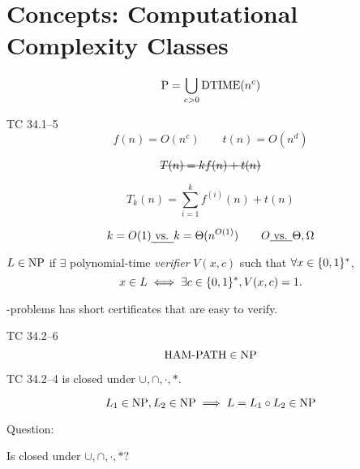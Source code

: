 \section{Concepts: Computational Complexity Classes}

\begin{frame}{\p}
  \[
	\text{P} = \bigcup_{c > 0} \text{DTIME}(n^c)
  \]

  \begin{exampleblock}{TC 34.1--5}
	\[ 
	  f(n) = O(n^c) \qquad t(n) = O(n^d)
	\]
  \end{exampleblock}

  \[
	\hbox{\sout{$T(n) = kf(n) + t(n)$}}
  \]

  \[
	T_{k}(n) = \sum_{i=1}^{k}f^{(i)}(n) + t(n) 
  \]

  \[
	k = O(1) \text{\emph{ vs. }} k = \Theta(n^{O(1)}) \qquad O \emph{\text{ vs. }} \Theta, \Omega
  \]
\end{frame}
\begin{frame}{\np}
  \begin{definition}[\np]
	$L \in \text{NP}$ if $\exists$ polynomial-time \emph{verifier} $V(x,c)$ such that $\forall x \in \{0,1\}^{\ast}$,
	\[
	  x \in L \iff \exists c \in \{0,1\}^{\ast}, V(x,c) = 1.
	\]
  \end{definition}

  \vspace{0.50cm}
  \centerline{\np-problems has short certificates that are easy to verify.}

  \vspace{0.60cm}
  \begin{exampleblock}{TC 34.2--6}
	\[
	  \text{HAM-PATH} \in \text{NP}
	\]
  \end{exampleblock}
\end{frame}
\begin{frame}{\np}
  \begin{exampleblock}{TC 34.2--4}
	\np{} is closed under $\cup, \cap, \cdot, \ast$.

	\[
	  L_1 \in \text{NP}, L_2 \in \text{NP} \implies L = L_1 \circ L_2 \in \text{NP}
	\]
  \end{exampleblock}

  \vspace{0.60cm}
  \begin{alertblock}{Question:}
	\centerline{Is \npc{} closed under $\cup, \cap, \cdot, \ast$?}
  \end{alertblock}
\end{frame}
